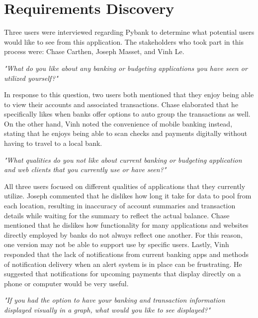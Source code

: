 \section{Requirements Discovery}
\label{sect:requirements_discovery}

Three users were interviewed regarding Pybank to determine what potential users would like to see from this application. The stakeholders who took part in this process were: Chase Carthen, Joseph Masset, and Vinh Le.


    \bigskip\noindent\textit{"What do you like about any banking or budgeting applications you have seen or utilized yourself?"}
    
    \bigskip\noindent In response to this question, two users both mentioned that they enjoy being able to view their accounts and associated transactions. Chase elaborated that he specifically likes when banks offer options to auto group the transactions as well. On the other hand, Vinh noted the convenience of mobile banking instead, stating that he enjoys being able to scan checks and payments digitally without having to travel to a local bank. 

    \bigskip\noindent\textit{"What qualities do you not like about current banking or budgeting application and web clients that you currently use or have seen?"}

    \bigskip\noindent All three users focused on different qualities of applications that they currently utilize. Joseph commented that he dislikes how long it take for data to pool from each location, resulting in inaccuracy of account summaries and transaction details while waiting for the summary to reflect the actual balance. Chase mentioned that he dislikes how functionality for many applications and websites directly employed by banks do not always reflect one another. For this reason, one version may not be able to support use by specific users. Lastly, Vinh responded that the lack of notifications from current banking apps and methods of notification delivery when an alert system is in place can be frustrating. He suggested that notifications for upcoming payments that display directly on a phone or computer would be very useful.

    \bigskip\noindent\textit{"If you had the option to have your banking and transaction information displayed visually in a graph, what would you like to see displayed?"}
    
